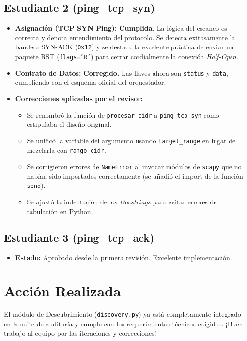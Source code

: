\documentclass[12pt,a4paper]{article}
\begin{document}
\subsection*{\textcolor{green!70!black}{Estudiante 2 (ping\_tcp\_syn)}}
\begin{itemize}[label=$\bullet$]
    \item \textbf{Asignación (TCP SYN Ping):} \textbf{\textcolor{green!70!black}{Cumplida.}} La lógica del escaneo es correcta y denota entendimiento del protocolo. Se detecta exitosamente la bandera SYN-ACK (\texttt{0x12}) y se destaca la excelente práctica de enviar un paquete RST (\texttt{flags='R'}) para cerrar cordialmente la conexión \textit{Half-Open}.
    \item \textbf{Contrato de Datos:} \textbf{\textcolor{green!70!black}{Corregido.}} Las llaves ahora son \texttt{status} y \texttt{data}, cumpliendo con el esquema oficial del orquestador.
    \item \textbf{Correcciones aplicadas por el revisor:}
    \begin{itemize}
        \item Se renombró la función de \texttt{procesar\_cidr} a \texttt{ping\_tcp\_syn} como estipulaba el diseño original.
        \item Se unificó la variable del argumento usando \texttt{target\_range} en lugar de mezclarla con \texttt{rango\_cidr}.
        \item Se corrigieron errores de \texttt{NameError} al invocar módulos de \texttt{scapy} que no habían sido importados correctamente (se añadió el import de la función \texttt{send}).
        \item Se ajustó la indentación de los \textit{Docstrings} para evitar errores de tabulación en Python.
    \end{itemize}
\end{itemize}

\subsection*{\textcolor{green!70!black}{Estudiante 3 (ping\_tcp\_ack)}}
\begin{itemize}[label=$\bullet$]
    \item \textbf{Estado:} Aprobado desde la primera revisión. Excelente implementación.
\end{itemize}

\section*{Acción Realizada}
El módulo de Descubrimiento (\texttt{discovery.py}) ya está completamente integrado en la suite de auditoría y cumple con los requerimientos técnicos exigidos. ¡Buen trabajo al equipo por las iteraciones y correcciones!
\end{document}
